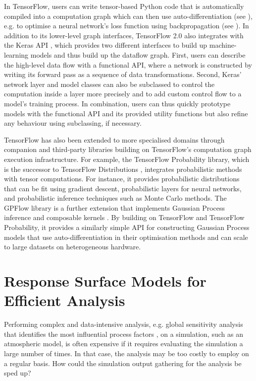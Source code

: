 In TensorFlow, users can write tensor-based Python code that is automatically compiled into a computation graph which can then use auto-differentiation (see ), e.g. to optimise a neural network's loss function using backpropagation (see ). In addition to its lower-level graph interfaces, TensorFlow 2.0 also integrates with the Keras API \cite{keras-2015}, which provides two different interfaces to build up machine-learning models and thus build up the dataflow graph. First, users can describe the high-level data flow with a functional API, where a network is constructed by writing its forward pass as a sequence of data transformations. Second, Keras' network layer and model classes can also be subclassed to control the computation inside a layer more precisely and to add custom control flow to a model's training process. In combination, users can thus quickly prototype models with the functional API and its provided utility functions but also refine any behaviour using subclassing, if necessary.

TensorFlow has also been extended to more specialised domains through companion and third-party libraries building on TensorFlow's computation graph execution infrastructure. For example, the TensorFlow Probability library, which is the successor to TensorFlow Distributions \cite{tensorflow-distributions-2017}, integrates probabilistic methods with tensor computations. For instance, it provides probabilistic distributions that can be fit using gradient descent, probabilistic layers for neural networks, and probabilistic inference techniques such as Monte Carlo methods. The GPFlow library is a further extension that implements Gaussian Process inference and composable kernels \cite{gpflow-2017, gpflow-2020}. By building on TensorFlow and TensorFlow Probability, it provides a similarly simple API for constructing Gaussian Process models that use auto-differentiation in their optimisation methods and can scale to large datasets on heterogeneous hardware.

\section{Response Surface Models for Efficient Analysis} \label{txt:response-surface-models}

Performing complex and data-intensive analysis, e.g. global sensitivity analysis that identifies the most influential process factors \cite{global-sensitivity-2015}, on a simulation, such as an atmospheric model, is often expensive if it requires evaluating the simulation a large number of times. In that case, the analysis may be too costly to employ on a regular basis. How could the simulation output gathering for the analysis be sped up?

